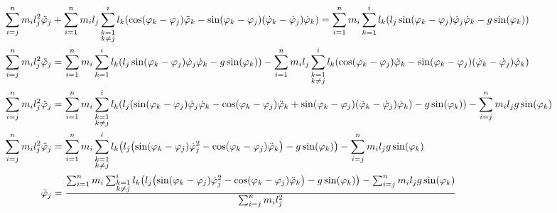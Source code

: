 \documentclass{article}
\renewcommand{\phi}{\varphi}
\begin{document}
\begin{align*}
  \sum_{i=j}^n m_i l_j^2 \ddot\phi_j &+ \sum_{i=1}^n m_i l_j \sum_{\substack{k=1\\k \neq j}}^i l_k \pqty{\cos(\phi_k - \phi_j) \ddot\phi_k - \sin(\phi_k - \phi_j)(\dot\phi_k - \dot\phi_j)\dot\phi_k} = \sum_{i=1}^n m_i \sum_{k=1}^i l_k \pqty{l_j \sin(\phi_k - \phi_j) \dot\phi_j \dot\phi_k - g \sin(\phi_k)} \\
  \sum_{i=j}^n m_i l_j^2 \ddot\phi_j &= \sum_{i=1}^n m_i \sum_{k=1}^i l_k \pqty{l_j \sin(\phi_k - \phi_j) \dot\phi_j \dot\phi_k - g \sin(\phi_k)} - \sum_{i=1}^n m_i l_j \sum_{\substack{k=1\\k \neq j}}^i l_k \pqty{\cos(\phi_k - \phi_j) \ddot\phi_k - \sin(\phi_k - \phi_j)(\dot\phi_k - \dot\phi_j)\dot\phi_k} \\
  \sum_{i=j}^n m_i l_j^2 \ddot\phi_j &= \sum_{i=1}^n m_i \sum_{\substack{k=1\\k \neq j}}^i l_k \pqty{l_j \pqty{\sin(\phi_k - \phi_j) \dot\phi_j \dot\phi_k - \cos(\phi_k - \phi_j) \ddot\phi_k + \sin(\phi_k - \phi_j)(\dot\phi_k - \dot\phi_j)\dot\phi_k} - g \sin(\phi_k)} - \sum_{i=j}^n m_i l_j g \sin(\phi_k) \\
  \sum_{i=j}^n m_i l_j^2 \ddot\phi_j &= \sum_{i=1}^n m_i \sum_{\substack{k=1\\k \neq j}}^i l_k \pqty{l_j \pqty{\sin(\phi_k - \phi_j) \dot\phi_j^2 - \cos(\phi_k - \phi_j) \ddot\phi_k} - g \sin(\phi_k)} - \sum_{i=j}^n m_i l_j g \sin(\phi_k) \\
  \ddot\phi_j &= \frac{\sum_{i=1}^n m_i \sum_{\substack{k=1\\k \neq j}}^i l_k \pqty{l_j \pqty{\sin(\phi_k - \phi_j) \dot\phi_j^2 - \cos(\phi_k - \phi_j) \ddot\phi_k} - g \sin(\phi_k)} - \sum_{i=j}^n m_i l_j g \sin(\phi_k)}{\sum_{i=j}^n m_i l_j^2} \\
\end{align*}
\end{document}
